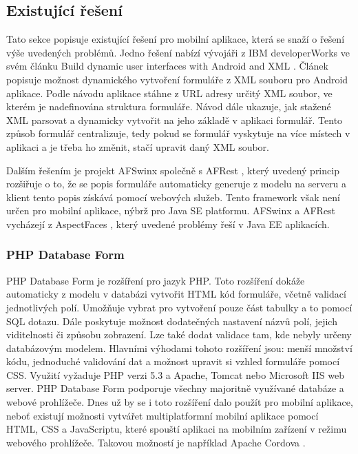 \subsection{Existující řešení}
Tato sekce popisuje existující řešení pro mobilní aplikace, která se snaží o řešení výše uvedených problémů. Jedno řešení nabízí vývojáři z IBM developerWorks ve svém článku Build dynamic user interfaces with Android and XML \cite{dynamic-android-xml}. Článek popisuje možnost dynamického vytvoření formuláře z XML souboru pro Android aplikace. Podle návodu aplikace stáhne z URL adresy určitý XML soubor, ve kterém je nadefinována struktura formuláře. Návod dále ukazuje, jak stažené XML parsovat a dynamicky vytvořit na jeho základě v aplikaci formulář. Tento způsob formulář centralizuje, tedy pokud se formulář vyskytuje na více místech v aplikaci a je třeba ho změnit, stačí upravit daný XML soubor.

Dalším řešením je projekt AFSwinx společně s AFRest \cite{tomasek-thesis}, který uvedený princip rozšiřuje o to, že se popis formuláře automaticky generuje z modelu na serveru a klient tento popis získává pomocí webových služeb. Tento framework však není určen pro mobilní aplikace, nýbrž pro Java SE platformu. AFSwinx a AFRest vycházejí z AspectFaces \cite{aspect-faces}, který uvedené problémy řeší v Java EE aplikacích.

\subsubsection{PHP Database Form}
PHP Database Form \cite{phpdbform} je rozšíření pro jazyk PHP. Toto rozšíření dokáže automaticky z modelu v databázi vytvořit HTML kód formuláře, včetně validací jednotlivých polí. Umožňuje vybrat pro vytvoření pouze část tabulky a to pomocí SQL dotazu. Dále poskytuje možnost dodatečných nastavení názvů polí, jejich viditelnosti či způsobu zobrazení. Lze také dodat validace tam, kde nebyly určeny databázovým modelem. Hlavními výhodami tohoto rozšíření jsou: menší množství kódu, jednoduché validování dat a možnost upravit si vzhled formuláře pomocí CSS. Využití vyžaduje PHP verzi 5.3 a Apache, Tomcat nebo Microsoft IIS web server. PHP Database Form podporuje všechny majoritně využívané databáze a webové prohlížeče. Dnes už by se i toto rozšíření dalo použít pro mobilní aplikace, neboť existují možnosti vytvářet multiplatformní mobilní aplikace pomocí HTML, CSS a JavaScriptu, které spouští aplikaci na mobilním zařízení v režimu webového prohlížeče. Takovou možností je například Apache Cordova \cite{apache-cordova}.

